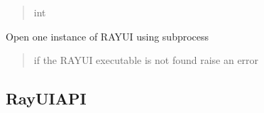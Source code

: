 \documentclass[letterpaper,10pt,english]{sphinxmanual}
\begin{document}
\begin{fulllineitems}
\begin{fulllineitems}
\begin{quote}
\begin{description}
\sphinxAtStartPar
int

\end{description}\end{quote}

\end{fulllineitems}


\begin{fulllineitems}
\label{\detokenize{API:raypyng.runner.RayUIRunner.run}}
\pysigstartsignatures
{}
\pysigstopsignatures
\sphinxAtStartPar
Open one instance of RAY\sphinxhyphen{}UI using subprocess
\begin{quote}\begin{description}
\sphinxAtStartPar
{} \textendash{} if the RAY\sphinxhyphen{}UI executable is not found raise an error

\end{description}\end{quote}

\end{fulllineitems}


\end{fulllineitems}



\subsection{RayUIAPI}
\label{\detokenize{API:rayuiapi}}
\end{document}
